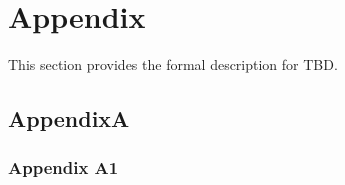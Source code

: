 \chapter{Appendix}
\label{app:appendix}

This section provides the formal description for TBD.  
\section{AppendixA}
\label{app:aa}



\subsection{Appendix A1}

